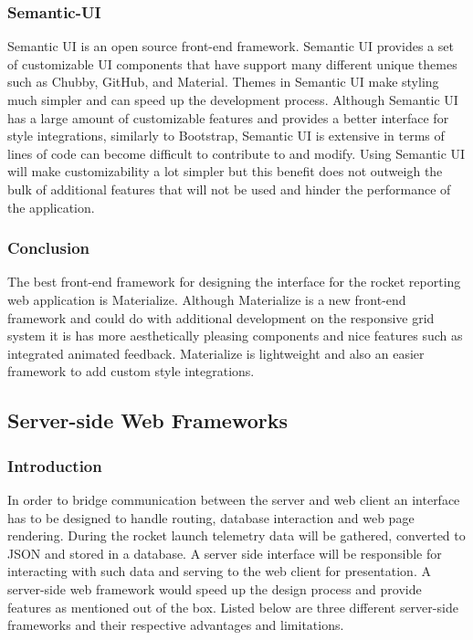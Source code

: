 \documentclass[onecolumn, draftclsnofoot,10pt, compsoc]{IEEEtran}
\begin{document}
\subsubsection{Semantic-UI}
Semantic UI is an open source front-end framework. Semantic UI provides a set of customizable UI components that have support many different unique themes such as Chubby, GitHub, and Material. Themes in Semantic UI make styling much simpler and can speed up the development process. Although Semantic UI has a large amount of customizable features and provides a better interface for style integrations, similarly to Bootstrap, Semantic UI is extensive in terms of lines of code can become difficult to contribute to and modify. Using Semantic UI will make customizability a lot simpler but this benefit does not outweigh the bulk of additional features that will not be used and hinder the performance of the application.
\subsubsection{Conclusion}
The best front-end framework for designing the interface for the rocket reporting web application is Materialize. Although Materialize is a new front-end framework and could do with additional development on the responsive grid system it is has more aesthetically pleasing components and nice features such as integrated animated feedback. Materialize is lightweight and also an easier framework to add custom style integrations.
\subsection{Server-side Web Frameworks}
\subsubsection{Introduction}
In order to bridge communication between the server and web client an interface has to be designed to handle routing, database interaction and web page rendering. During the rocket launch telemetry data will be gathered, converted to JSON and stored in a database. A server side interface will be responsible for interacting with such data and serving to the web client for presentation. A server-side web framework would speed up the design process and provide features as mentioned out of the box. Listed below are three different server-side frameworks and their respective advantages and limitations. 
\end{document}

